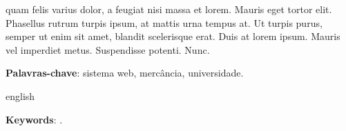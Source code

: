 \begin{resumo}
quam felis varius dolor, a feugiat nisi massa et lorem. Mauris eget tortor elit. Phasellus rutrum turpis ipsum, at mattis urna tempus at. Ut turpis purus, semper ut enim sit amet, blandit scelerisque erat. Duis at lorem ipsum. Mauris vel imperdiet metus. Suspendisse potenti. Nunc.


 \textbf{Palavras-chave}: sistema web, mercância, universidade.
\end{resumo}

\begin{resumo}[Abstract]
 \begin{otherlanguage*}{english}

   \vspace{\onelineskip}
 
   \noindent 
   \textbf{Keywords}: .
 \end{otherlanguage*}
\end{resumo}

% 
%
%  
